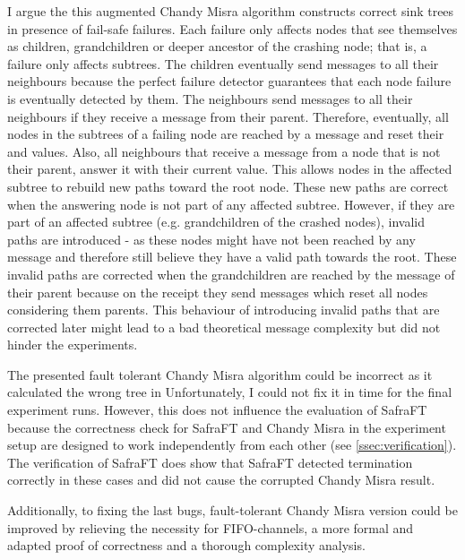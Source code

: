 I argue the this augmented Chandy Misra algorithm constructs correct sink trees in presence of fail-safe failures. 
Each failure only affects nodes that see themselves as children, grandchildren or deeper ancestor of the crashing node; that is, a failure only affects subtrees.
The children eventually send  messages to all their neighbours because the perfect failure detector guarantees that each node failure is eventually detected by them.
The neighbours send  messages to all their neighbours if they receive a  message from their parent. 
Therefore, eventually, all nodes in the subtrees of a failing node are reached by a  message and reset their  and  values.
Also, all neighbours that receive a  message from a node that is not their parent, answer it with their current  value.
This allows nodes in the affected subtree to rebuild new paths toward the root node.
These new paths are correct when the answering node is not part of any affected subtree.
However, if they are part of an affected subtree (e.g. grandchildren of the crashed nodes), invalid paths are introduced - as these nodes might have not been reached by any  message and therefore still believe they have a valid path towards the root.
These invalid paths are corrected when the grandchildren are reached by the  message of their parent because on the receipt they send  messages which reset all nodes considering them parents. 
This behaviour of introducing invalid paths that are corrected later might lead to a bad theoretical message complexity but did not hinder the experiments.

The presented fault tolerant Chandy Misra algorithm could be incorrect as it calculated the wrong tree in %
Unfortunately, I could not fix it in time for the final experiment runs. 
However, this does not influence the evaluation of SafraFT because the correctness check for SafraFT and Chandy Misra in the experiment setup are designed to work independently from each other (see \cref{ssec:verification}).
The verification of SafraFT does show that SafraFT detected termination correctly in these cases and did not cause the corrupted Chandy Misra result.

Additionally, to fixing the last bugs, fault-tolerant Chandy Misra version could be improved by relieving the necessity for FIFO-channels, a more formal and adapted proof of correctness and a thorough complexity analysis. 

